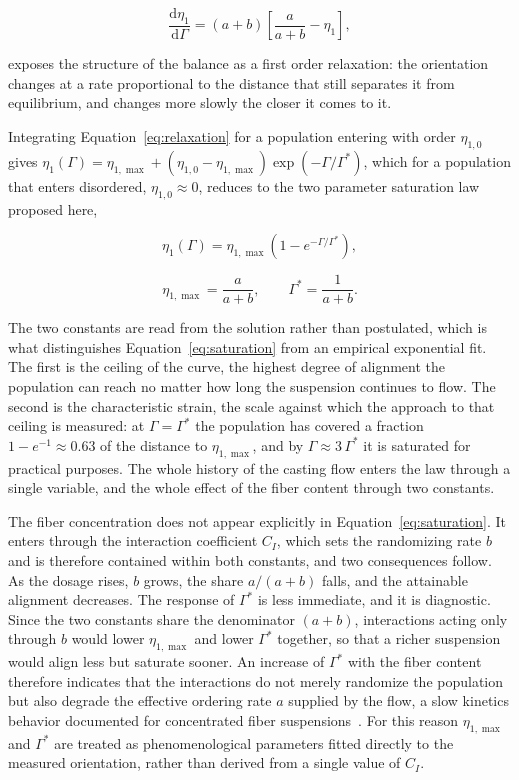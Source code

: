 \documentclass[%
  aip,
  pof,          %
  reprint,      %
  floatfix
]{revtex4-2}
\begin{document}
\begin{equation}
    \frac{\mathrm{d}\eta_1}{\mathrm{d}\Gamma} = (a+b)\left[\frac{a}{a+b} - \eta_1\right],
    \label{eq:relaxation}
\end{equation}

exposes the structure of the balance as a first order relaxation: the orientation changes at a rate proportional to the distance that still separates it from equilibrium, and changes more slowly the closer it comes to it.

Integrating Equation~\eqref{eq:relaxation} for a population entering with order $\eta_{1,0}$ gives $\eta_1(\Gamma) = \eta_{1,\max} + (\eta_{1,0} - \eta_{1,\max})\exp(-\Gamma/\Gamma^*)$, which for a population that enters disordered, $\eta_{1,0} \approx 0$, reduces to the two parameter saturation law proposed here,

\begin{equation}
    \eta_1(\Gamma) = \eta_{1,\max}\left(1 - e^{-\Gamma/\Gamma^*}\right),
    \label{eq:saturation}
\end{equation}

\begin{equation}
    \eta_{1,\max} = \frac{a}{a+b}, \qquad \Gamma^* = \frac{1}{a+b}.
    \label{eq:parameters}
\end{equation}

The two constants are read from the solution rather than postulated, which is what distinguishes Equation~\eqref{eq:saturation} from an empirical exponential fit. The first is the ceiling of the curve, the highest degree of alignment the population can reach no matter how long the suspension continues to flow. The second is the characteristic strain, the scale against which the approach to that ceiling is measured: at $\Gamma = \Gamma^*$ the population has covered a fraction $1 - e^{-1} \approx 0.63$ of the distance to $\eta_{1,\max}$, and by $\Gamma \approx 3\,\Gamma^*$ it is saturated for practical purposes. The whole history of the casting flow enters the law through a single variable, and the whole effect of the fiber content through two constants.

The fiber concentration does not appear explicitly in Equation~\eqref{eq:saturation}. It enters through the interaction coefficient $C_I$, which sets the randomizing rate $b$ and is therefore contained within both constants, and two consequences follow. As the dosage rises, $b$ grows, the share $a/(a+b)$ falls, and the attainable alignment decreases. The response of $\Gamma^*$ is less immediate, and it is diagnostic. Since the two constants share the denominator $(a+b)$, interactions acting only through $b$ would lower $\eta_{1,\max}$ and lower $\Gamma^*$ together, so that a richer suspension would align less but saturate sooner. An increase of $\Gamma^*$ with the fiber content therefore indicates that the interactions do not merely randomize the population but also degrade the effective ordering rate $a$ supplied by the flow, a slow kinetics behavior documented for concentrated fiber suspensions~\cite{wang2008objective}. For this reason $\eta_{1,\max}$ and $\Gamma^*$ are treated as phenomenological parameters fitted directly to the measured orientation, rather than derived from a single value of $C_I$.
\end{document}
